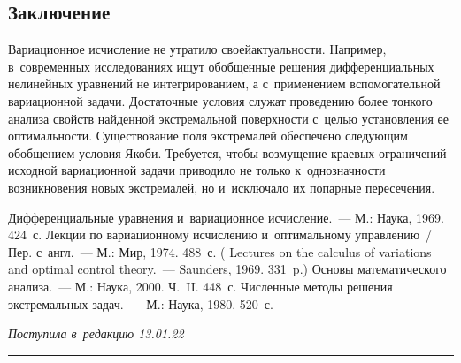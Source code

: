 \begin{multicols}{2}
\section{Заключение }

    Вариационное исчисление не утратило своей\linebreak актуальности. Например, 
в~современных исследованиях ищут обобщенные решения дифференциальных 
нелинейных уравнений не интегрированием, а с~применением вспомогательной 
\mbox{вариационной} задачи. Достаточные условия служат проведению более тонкого 
анализа свойств найден\-ной экстремальной поверхности с~целью установления ее 
оптимальности. Существование поля экстремалей обеспечено следующим 
обобщением условия Якоби. Требуется, чтобы возмущение краевых ограничений 
исходной вариационной задачи приводило не только к~однозначности 
возникновения новых экстремалей, но и~исключало их попарные пересечения.
     
{\small\frenchspacing
 {%
 \begin{thebibliography}{9}
 Дифференциальные уравнения и~вариационное исчисление.~--- 
М.: Наука, 1969. 424~с.
 Лекции по вариационному исчислению и~оптимальному управлению~/ Пер. с~англ.~--- 
М.: Мир, 1974. 488~с.
( {Lectures on the calculus of variations and optimal control theory}.~--- Saunders, 1969. 331~p.)
 Основы математического анализа.~--- М.: 
Наука, 2000.  Ч.~II. 448~с.
 Численные методы решения экстремальных задач.~--- М.: 
Наука, 1980. 520~с. 
\end{thebibliography}

 }
 }

\end{multicols}

\vspace*{-6pt}

\hfill{\small\textit{Поступила в~редакцию 13.01.22}}

\vspace*{8pt}




\hrule

\vspace*{2pt}

